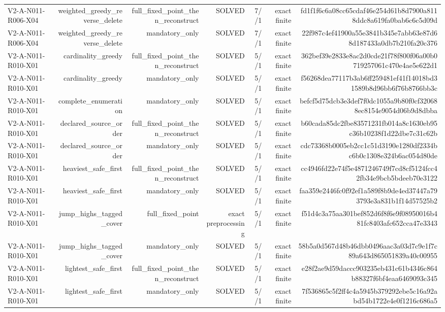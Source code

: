 {\begin{longtable}{lrrrrrr}
V2-A-N011-R006-X04 & weighted\_greedy\_reverse\_delete & full\_fixed\_point\_then\_reconstruct & SOLVED & 7//1 & exact finite & fd1f1f6c6a08cc65cdaf46e254d61b8d7900a8118ddc8a619fa0bab6c6c5d09d \\
V2-A-N011-R006-X04 & weighted\_greedy\_reverse\_delete & mandatory\_only & SOLVED & 7//1 & exact finite & 22f987c4ef41900a55e3841b345e7abb63e87d68d187433a0db7b210fa20c376 \\
V2-A-N011-R010-X01 & cardinality\_greedy & full\_fixed\_point\_then\_reconstruct & SOLVED & 5//1 & exact finite & 362bef39e2833e8ac2d0cde21f78f800f06a00b0719257061c470e4ae5e622d1 \\
V2-A-N011-R010-X01 & cardinality\_greedy & mandatory\_only & SOLVED & 5//1 & exact finite & f56268dea77117b3ab6ff259481ef41f14018bd31589b8d96bb6f76b8766bb3c \\
V2-A-N011-R010-X01 & complete\_enumeration & mandatory\_only & SOLVED & 5//1 & exact finite & befcf5d75dcb3e3def7f0dc1055a9b80f0cf320688ec8154e9054d06b9d8dbba \\
V2-A-N011-R010-X01 & declared\_source\_order & full\_fixed\_point\_then\_reconstruct & SOLVED & 5//1 & exact finite & b60cada85dc2fbe83571231fb014a8c1630eb95c36b10238f1d22dbe7c31c62b \\
V2-A-N011-R010-X01 & declared\_source\_order & mandatory\_only & SOLVED & 5//1 & exact finite & cdc73368b0005eb2cc1c51d3190e1280df2334bc6b0c1308e324b6ac054d80de \\
V2-A-N011-R010-X01 & heaviest\_safe\_first & full\_fixed\_point\_then\_reconstruct & SOLVED & 5//1 & exact finite & cc4946fd22e74f5e4871246749f7cd8cf5124fcc42fb34e9bcb5bdeeb70e3122 \\
V2-A-N011-R010-X01 & heaviest\_safe\_first & mandatory\_only & SOLVED & 5//1 & exact finite & faa359e2446fc0f92ef1a589f8b9de4ed37447a793793e3a831b1f14d57525b2 \\
V2-A-N011-R010-X01 & jump\_highs\_tagged\_cover & full\_fixed\_point & exact preprocessing & 5//1 & exact finite & f51d4c3a75aa301bef852d6f8f6e9f08950016b481fc8403afc652cca47e3343 \\
V2-A-N011-R010-X01 & jump\_highs\_tagged\_cover & mandatory\_only & SOLVED & 5//1 & exact finite & 58b5a0d567d48b46dbb0496aac3a03d7c9e1f7c89a643d865051839a40c00955 \\
V2-A-N011-R010-X01 & lightest\_safe\_first & full\_fixed\_point\_then\_reconstruct & SOLVED & 5//1 & exact finite & e28f2ae9d59daccc903235eb431c61b4346c864b88327f6bf4eaa6469093c345 \\
V2-A-N011-R010-X01 & lightest\_safe\_first & mandatory\_only & SOLVED & 5//1 & exact finite & 7f536865c5f2ff4c4a5945b379292ebe5c16a92abd54b1722e4e0f1216c686a5 \\

\end{longtable}}

